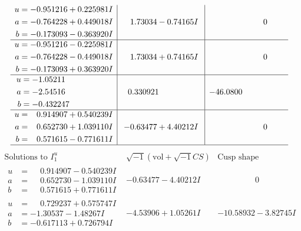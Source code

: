 \documentclass[1p]{elsarticle_modified}
\theoremstyle{definition}
\newcommand{\I}{\sqrt{-1}}
\begin{document}
$$\begin{array}{c|c|c}
\begin{aligned}
u &= -0.951216 + 0.225981 I \\
a &= -0.764228 + 0.449018 I \\
b &= -0.173093 - 0.363920 I\end{aligned}
 & \phantom{-}1.73034 - 0.74165 I & \phantom{-0.000000 } 0 \\ \hline\begin{aligned}
u &= -0.951216 - 0.225981 I \\
a &= -0.764228 - 0.449018 I \\
b &= -0.173093 + 0.363920 I\end{aligned}
 & \phantom{-}1.73034 + 0.74165 I & \phantom{-0.000000 } 0 \\ \hline\begin{aligned}
u &= -1.05211\phantom{ +0.000000I} \\
a &= -2.54516\phantom{ +0.000000I} \\
b &= -0.432247\phantom{ +0.000000I}\end{aligned}
 & \phantom{-}0.330921\phantom{ +0.000000I} & -46.0800\phantom{ +0.000000I} \\ \hline\begin{aligned}
u &= \phantom{-}0.914907 + 0.540239 I \\
a &= \phantom{-}0.652730 + 1.039110 I \\
b &= \phantom{-}0.571615 - 0.771611 I\end{aligned}
 & -0.63477 + 4.40212 I & \phantom{-0.000000 } 0\\
 \hline 
 \end{array}$$\newpage$$\begin{array}{c|c|c}  
\text{Solutions to }I^u_{1}& \I (\text{vol} + \sqrt{-1}CS) & \text{Cusp shape}\\
 \hline 
\begin{aligned}
u &= \phantom{-}0.914907 - 0.540239 I \\
a &= \phantom{-}0.652730 - 1.039110 I \\
b &= \phantom{-}0.571615 + 0.771611 I\end{aligned}
 & -0.63477 - 4.40212 I & \phantom{-0.000000 } 0 \\ \hline\begin{aligned}
u &= \phantom{-}0.729237 + 0.575747 I \\
a &= -1.30537 - 1.48267 I \\
b &= -0.617113 + 0.726794 I\end{aligned}
 & -4.53906 + 1.05261 I & -10.58932 - 3.82745 I \\ \hline\begin{aligned}

\end{aligned}
\end{array}$$
\end{document}
